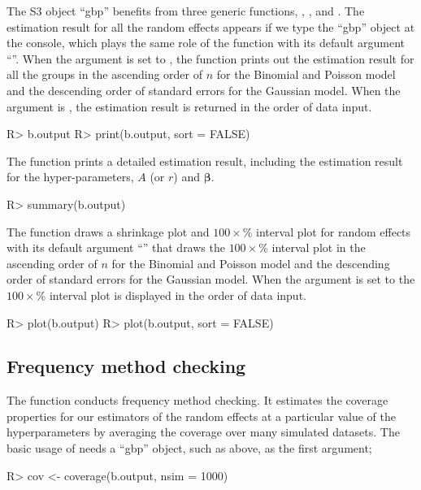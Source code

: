 \documentclass[article]{jss}
\begin{document}
The S3 object ``gbp'' benefits from three generic functions, ,
, and . The estimation result for all the random
effects appears if we type the ``gbp'' object at the  console, which
plays the same role of the function  with its default argument
``''. When the argument  is set to , the
function  prints out the estimation result for all the groups in the
ascending order of $n$ for the Binomial and Poisson model and the descending
order of standard errors for the Gaussian model. When the argument 
is , the estimation result is returned in the order of data input.
\begin{CodeChunk}
\begin{CodeInput}
R> b.output
R> print(b.output, sort = FALSE)
\end{CodeInput}
\end{CodeChunk}

The function  prints a detailed estimation result, including the estimation result for the hyper-parameters, $A$ (or $r$) and $\boldsymbol{\beta}$.
\begin{CodeChunk}
\begin{CodeInput}
R> summary(b.output)
\end{CodeInput}
\end{CodeChunk}

The function  draws a shrinkage plot and $100\times$\% interval plot for random effects with its default argument ``'' that draws the $100\times$\% interval plot in the ascending order of $n$ for the Binomial and Poisson model and the descending order of standard errors for the Gaussian model. When the argument  is set to   the $100\times$\% interval plot is displayed in the order of data input.
\begin{CodeChunk}
\begin{CodeInput}
R> plot(b.output)
R> plot(b.output, sort = FALSE)
\end{CodeInput}
\end{CodeChunk}

\subsection{Frequency method checking}
The function  conducts frequency method checking. It estimates
the coverage properties for our estimators of the random effects at
a particular value of the hyperparameters by averaging the coverage over many simulated datasets. The basic usage of  needs a ``gbp'' object, such as  above, as the first argument;
\begin{CodeChunk}
\begin{CodeInput}
R> cov <- coverage(b.output, nsim = 1000)
\end{CodeInput}
\end{CodeChunk}
\end{document}

